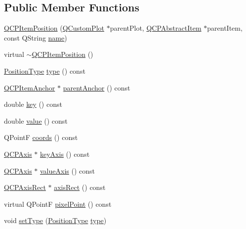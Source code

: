 \subsection*{Public Member Functions}
\begin{DoxyCompactItemize}
\item 
\hyperlink{class_q_c_p_item_position_a3efc524f37fdcd22907545eb77555ce4}{Q\-C\-P\-Item\-Position} (\hyperlink{class_q_custom_plot}{Q\-Custom\-Plot} $\ast$parent\-Plot, \hyperlink{class_q_c_p_abstract_item}{Q\-C\-P\-Abstract\-Item} $\ast$parent\-Item, const Q\-String \hyperlink{class_q_c_p_item_anchor_ac93984042a58c875e76847dc3e5f75fe}{name})
\item 
virtual \hyperlink{class_q_c_p_item_position_ad8a289016f7a62332f9c865c39ab2047}{$\sim$\-Q\-C\-P\-Item\-Position} ()
\item 
\hyperlink{class_q_c_p_item_position_aad9936c22bf43e3d358552f6e86dbdc8}{Position\-Type} \hyperlink{class_q_c_p_item_position_ad64a1a26fbed5b8917e0eb8843099fd6}{type} () const 
\item 
\hyperlink{class_q_c_p_item_anchor}{Q\-C\-P\-Item\-Anchor} $\ast$ \hyperlink{class_q_c_p_item_position_a0db87cc41efabc1cf94acee7ebe14eee}{parent\-Anchor} () const 
\item 
double \hyperlink{class_q_c_p_item_position_ac3cb2bddf5f89e5181830be30b93d090}{key} () const 
\item 
double \hyperlink{class_q_c_p_item_position_a6817f7356d3a2b63e8446c6b6106dae1}{value} () const 
\item 
Q\-Point\-F \hyperlink{class_q_c_p_item_position_a253d7adbb6d46299bd6cbc31aa8819f1}{coords} () const 
\item 
\hyperlink{class_q_c_p_axis}{Q\-C\-P\-Axis} $\ast$ \hyperlink{class_q_c_p_item_position_ab99de7ae5766d246defb2de9f47eaf51}{key\-Axis} () const 
\item 
\hyperlink{class_q_c_p_axis}{Q\-C\-P\-Axis} $\ast$ \hyperlink{class_q_c_p_item_position_a8d3a039fb2e69df86b4015daa30dfd2d}{value\-Axis} () const 
\item 
\hyperlink{class_q_c_p_axis_rect}{Q\-C\-P\-Axis\-Rect} $\ast$ \hyperlink{class_q_c_p_item_position_adf5dfa5007f2a0909e1233bdfcacddfd}{axis\-Rect} () const 
\item 
virtual Q\-Point\-F \hyperlink{class_q_c_p_item_position_ae490f9c76ee2ba33752c495d3b6e8fb5}{pixel\-Point} () const 
\item 
void \hyperlink{class_q_c_p_item_position_aa476abf71ed8fa4c537457ebb1a754ad}{set\-Type} (\hyperlink{class_q_c_p_item_position_aad9936c22bf43e3d358552f6e86dbdc8}{Position\-Type} \hyperlink{class_q_c_p_item_position_ad64a1a26fbed5b8917e0eb8843099fd6}{type})

\end{DoxyCompactItemize}
